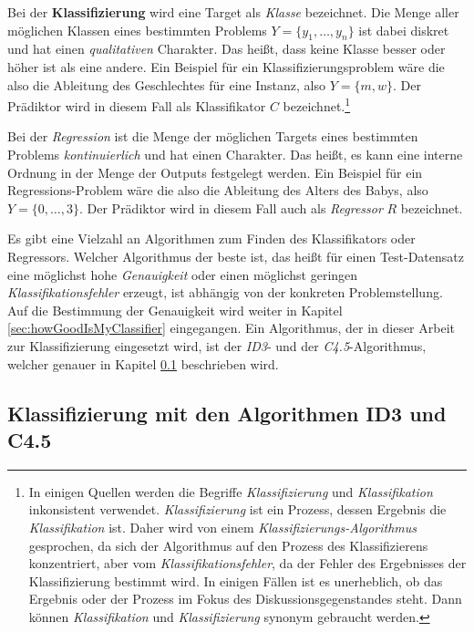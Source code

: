 Bei der \textbf{Klassifizierung} wird eine Target als \emph{Klasse} bezeichnet. Die Menge aller möglichen Klassen eines bestimmten Problems $Y = \{ y_1 , \ldots, y_n\}$ ist dabei diskret und hat einen \emph{qualitativen} Charakter. Das heißt, dass keine Klasse \glqq besser\grqq{} oder \glqq höher\grqq{} ist als eine andere. Ein Beispiel für ein Klassifizierungsproblem wäre die also die Ableitung des Geschlechtes für eine Instanz, also $Y = \{m, w\}$. Der Prädiktor wird in diesem Fall als Klassifikator $C$ bezeichnet.\footnote{In einigen Quellen werden die Begriffe \emph{Klassifizierung} und \emph{Klassifikation} inkonsistent verwendet. \emph{Klassifizierung} ist ein Prozess, dessen Ergebnis die \emph{Klassifikation} ist. Daher wird von einem \emph{Klassifizierungs-Algorithmus} gesprochen, da sich der Algorithmus auf den Prozess des Klassifizierens konzentriert, aber vom \emph{Klassifikationsfehler}, da der Fehler des Ergebnisses der Klassifizierung bestimmt wird. In einigen Fällen ist es unerheblich, ob das Ergebnis oder der Prozess im Fokus des Diskussionsgegenstandes steht. Dann können \emph{Klassifikation} und \emph{Klassifizierung} synonym gebraucht werden. } \cite[S. 28, 127]{statistical_learning}

Bei der \emph{Regression} ist die Menge der möglichen Targets eines bestimmten Problems \emph{kontinuierlich} und hat einen  Charakter. Das heißt, es kann eine interne Ordnung in der Menge der Outputs festgelegt werden. Ein Beispiel für ein Regressions-Problem wäre die also die Ableitung des Alters des Babys, also $Y = \{ 0 , \ldots , 3\}$. Der Prädiktor wird in diesem Fall auch als \emph{Regressor} $R$ bezeichnet.\cite[S. 24]{learning_cart_dobra} \cite[S. 8]{machine_marsland} \cite[S. 28]{statistical_learning}

Es gibt eine Vielzahl an Algorithmen zum Finden des Klassifikators oder Regressors. Welcher Algorithmus der \glqq beste\grqq{} ist, das heißt für einen Test-Datensatz eine möglichst hohe \emph{Genauigkeit} oder einen möglichst geringen \emph{Klassifikationsfehler} erzeugt, ist abhängig von der konkreten Problemstellung. Auf die Bestimmung der Genauigkeit wird weiter in Kapitel \ref{sec:howGoodIsMyClassifier} eingegangen. Ein Algorithmus, der in dieser Arbeit zur Klassifizierung eingesetzt wird, ist der \emph{ID3}- und der \emph{C4.5}-Algorithmus, welcher genauer in Kapitel \ref{sec:id3} beschrieben wird.

\subsection{Klassifizierung mit den Algorithmen ID3 und C4.5}
\label{sec:id3}



